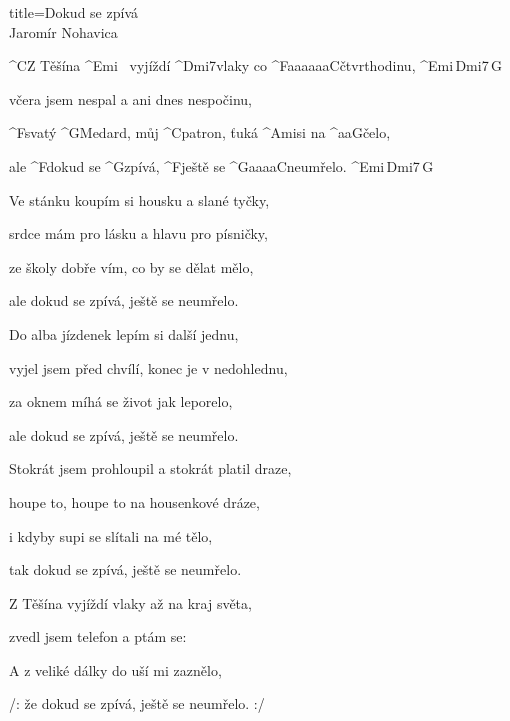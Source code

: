 \begin{song}{title=\predtitle\centering Dokud se zpívá \\\large Jaromír Nohavica  \vspace*{-0.3cm}}  %
\begin{centerjustified}
\nejnejvetsi

\sloka 
	^{C}Z Těšína ^{Emi\,\,\,\,\,}vyjíždí ^{Dmi7}vlaky co ^{F{\color{white}aaaaaa}C}čtvrthodinu, ^{Emi\,Dmi7\,G}

	včera jsem nespal a ani dnes nespočinu,

	^{F}svatý ^{G}Medard, můj ^{C}patron, ťuká ^{Ami}si na ^{{\color{white}aa}G}čelo,

	ale ^{F}dokud se ^{G}zpívá, ^{F}ještě se ^{G{\color{white}aaaa}C}neumřelo. ^{Emi\,Dmi7\,G}

\sloka
	Ve stánku koupím si housku a slané tyčky,
	
	srdce mám pro lásku a hlavu pro písničky,
	
	ze školy dobře vím, co by se dělat mělo,
	
	ale dokud se zpívá, ještě se neumřelo.

\sloka
	Do alba jízdenek lepím si další jednu,
   
	vyjel jsem před chvílí, konec je v nedohlednu,
	
	za oknem míhá se život jak leporelo,
	
	ale dokud se zpívá, ještě se neumřelo.

\sloka
	Stokrát jsem prohloupil a stokrát platil draze,
	
	houpe to, houpe to na housenkové dráze,
	
	i kdyby supi se slítali na mé tělo,
	
	tak dokud se zpívá, ještě se neumřelo.

\sloka
	Z Těšína vyjíždí vlaky až na kraj světa,
	
	zvedl jsem telefon a ptám se: 
	
	A z veliké dálky do uší mi zaznělo,
	
	/: že dokud se zpívá, ještě se neumřelo. :/


\end{centerjustified}
\setcounter{Slokočet}{0}
\end{song}
